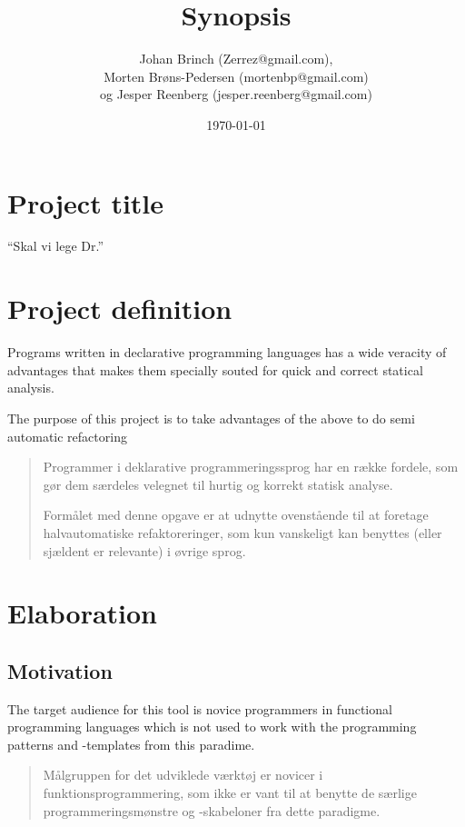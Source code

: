 \documentclass[a4paper,oneside]{memoir}
\title{Synopsis}
\author{Johan Brinch (Zerrez@gmail.com), \\
Morten Brøns-Pedersen (mortenbp@gmail.com) \\ og
Jesper Reenberg (jesper.reenberg@gmail.com)}
\date{\today}
\begin{document}
\maketitle

\section{Project title}

``Skal vi lege Dr.''

\section{Project definition}

Programs written in declarative programming languages has a wide veracity of
advantages that makes them specially souted  for quick and correct statical
analysis.

The purpose of this project is to take advantages of the above to do semi
automatic refactoring




\begin{quotation}
  Programmer i deklarative programmeringssprog har en række fordele, som gør dem
  særdeles velegnet til hurtig og korrekt statisk analyse.

  Formålet med denne opgave er at udnytte ovenstående til at foretage
  halvautomatiske refaktoreringer, som kun vanskeligt kan benyttes (eller
  sjældent er relevante) i øvrige sprog.
\end{quotation}

\section{Elaboration}

\subsection{Motivation}

The target audience for this tool is novice programmers in functional
programming languages which is not used to work with the programming patterns
and -templates from this paradime. 

\begin{quotation}
  Målgruppen for det udviklede værktøj er novicer i funktionsprogrammering, som
  ikke er vant til at benytte de særlige programmeringsmønstre og -skabeloner
  fra dette paradigme.
\end{quotation}
\end{document}
